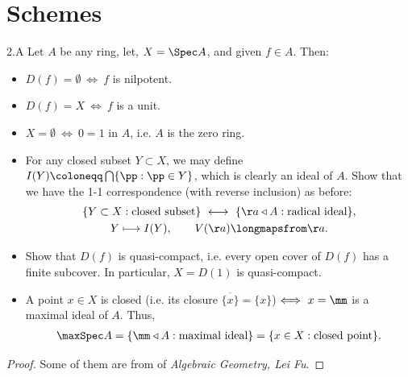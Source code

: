 \chapter{Schemes}
\begin{exe}{2.A}
    Let $A$ be any ring, let, $X=\Spec A$, and given $f\in A$. Then:
    \begin{itemize}
        \item[(i)] $D(f)=\emptyset\ \Longleftrightarrow\ f$ is nilpotent.
        \item[(ii)] $D(f)=X\ \Longleftrightarrow\ f$ is a unit.
        \item[(iii)] $X=\emptyset\ \Longleftrightarrow\ 0=1$ in $A$, i.e. $A$ is the zero ring.
        \item[(iv)] For any closed subset $Y\subset X$, we may define $I(Y)\coloneqq\bigcap\{\pp:\pp\in Y\}$, which is clearly an ideal of $A$. Show that we have the 1-1 correspondence (with reverse inclusion) as before:
        \begin{gather*}
            \{Y\subset X:\text{closed subset}\}\ \longleftrightarrow\ \{\aa\triangleleft A:\text{radical ideal}\},\\
            Y\longmapsto I(Y),\qquad V(\aa)\longmapsfrom\aa.
        \end{gather*}
        \item[(v)] Show that $D(f)$ is quasi-compact, i.e. every open cover of $D(f)$ has a finite subcover. In particular, $X=D(1)$ is quasi-compact.
        \item[(vi)] A point $x\in X$ is closed (i.e. its closure $\overline{\{x\}}=\{x\}$) $\Longleftrightarrow\ x=\mm$ is a maximal ideal of $A$. Thus,
        \begin{align*}
            \maxSpec A=\{\mm\triangleleft A:\text{maximal ideal}\}=\{x\in X:\text{closed point}\}.
        \end{align*}
    \end{itemize}
\end{exe}
\begin{proof}
    Some of them are from  of \textit{Algebraic Geometry, Lei Fu}.
\end{proof}
